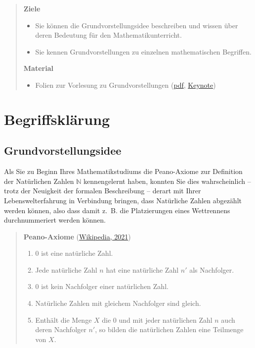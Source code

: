 \documentclass[
]{scrbook}
\providecommand{\tightlist}{%
  \setlength{\itemsep}{0pt}\setlength{\parskip}{0pt}}
\theoremstyle{definition}
\theoremstyle{definition}
\theoremstyle{definition}
\theoremstyle{definition}
\theoremstyle{remark}
\begin{document}
\begin{quote}
\textbf{Ziele}

\begin{itemize}
\tightlist
\item
  Sie können die Grundvorstellungsidee beschreiben und wissen über deren Bedeutung für den Mathematikunterricht.
\item
  Sie kennen Grundvorstellungen zu einzelnen mathematischen Begriffen.
\end{itemize}

\textbf{Material}

\begin{itemize}
\tightlist
\item
  Folien zur Vorlesung zu Grundvorstellungen (\href{files/Stoffdidaktik-WiSe2223-Kap3.pdf}{pdf}, \href{files/Stoffdidaktik-WiSe2223-Kap3.key}{Keynote})
\end{itemize}
\end{quote}

\hypertarget{grundvorstellungen-begriffsklaerung}{%
\section{Begriffsklärung}\label{grundvorstellungen-begriffsklaerung}}

\hypertarget{grundvorstellungsidee}{%
\subsection{Grundvorstellungsidee}\label{grundvorstellungsidee}}

Als Sie zu Beginn Ihres Mathematikstudiums die Peano-Axiome zur Definition der Natürlichen Zahlen \(\mathbb{N}\) kennengelernt haben, konnten Sie dies wahrscheinlich -- trotz der Neuigkeit der formalen Beschreibung -- derart mit Ihrer Lebenswelterfahrung in Verbindung bringen, dass Natürliche Zahlen abgezählt werden können, also dass damit z.~B. die Platzierungen eines Wettrennens durchnummeriert werden können.

\begin{quote}
\textbf{Peano-Axiome} (\protect\hyperlink{ref-WikiPeano}{Wikipedia, 2021})

\begin{enumerate}
\def\labelenumi{\arabic{enumi}.}
\tightlist
\item
  \(0\) ist eine natürliche Zahl.
\item
  Jede natürliche Zahl \(n\) hat eine natürliche Zahl \(n'\) als Nachfolger.
\item
  \(0\) ist kein Nachfolger einer natürlichen Zahl.
\item
  Natürliche Zahlen mit gleichem Nachfolger sind gleich.
\item
  Enthält die Menge \(X\) die \(0\) und mit jeder natürlichen Zahl \(n\) auch deren Nachfolger \(n'\), so bilden die natürlichen Zahlen eine Teilmenge von \(X\).
\end{enumerate}
\end{quote}
\end{document}
